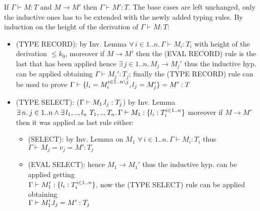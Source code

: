 If $\Gamma \vdash M: T$ and $M \to M'$ then $\Gamma \vdash M': T$.
The base cases are left unchanged, only the inductive ones has to be extended with the newly
added typing rules.
By induction on the height of the derivation of $\Gamma \vdash M: T$:
\begin{itemize}
	\item (TYPE RECORD): by Inv. Lemma $\forall\, i \in 1..n.\, \Gamma \vdash M_i: T_i$ with height
	      of the derivation $\le k_0$, moreover if $M \to M'$ then the (EVAL RECORD) rule is the
	      last that has been applied hence $\exists\, j \in 1..n.\, M_j \to M_j'$ thus the inductive
	      hyp. can be applied obtaining $\Gamma \vdash M_j' : T_j$; finally the (TYPE RECORD) rule
	      can be used to prove
	      $\Gamma \vdash \{l_i= M_i^{i \in 1..n \setminus j}, l_j = M_j'\} = M' : T$
	\item (TYPE SELECT): ($\Gamma \vdash M_1.l_j: T_j$) by Inv. Lemma\\
	      $\exists\, n.\, j \in 1..n \wedge \exists\, l_1,..,l_n\ T_1,..,T_n.\, \Gamma \vdash M_1 : \{l_i: T_i^{i \in 1..n}\}$
	      moreover if $M \to M'$ then it was applied as last rule either:
	      \begin{itemize}
		      \item (SELECT): by Inv. Lemma on $M_1$ $\forall\, i \in 1..n.\, \Gamma \vdash M_i: T_i$
		            thus $\Gamma \vdash M_j = v_j = M': T_j$
		      \item (EVAL SELECT): hence $M_1 \to M_1'$ thus the inductive hyp. can be applied getting\\
		            $\Gamma \vdash M_1': \{l_i: T_i^{i \in 1..n}\}$, now the  (TYPE SELECT) rule
		            can be applied obtaining\\
                $\Gamma \vdash M_1'.l_j = M': T_j$
	      \end{itemize}
\end{itemize}
